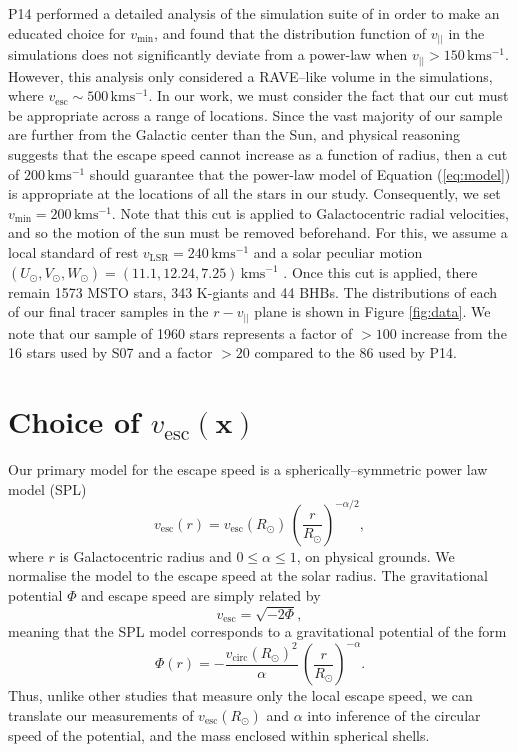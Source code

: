 \documentclass[useAMS,twocolumn,usenatbib]{mn2e}
\def\kms{{\,\mathrm{kms^{-1}}}}
\def\vlos{{v_{||}}}
\def\vesc{{v_\mathrm{esc}}}
\def\pos{{\boldsymbol{x}}}
\begin{document}
P14 performed a detailed analysis of the simulation suite of
\citet{Sc09} in order to make an educated choice for $v_\mathrm{min}$,
and found that the distribution function of $\vlos$ in the simulations
does not significantly deviate from a power-law when
$\vlos>150\kms$. However, this analysis only considered a RAVE--like
volume in the simulations, where $\vesc\sim500\kms$. In our work, we
must consider the fact that our cut must be appropriate across a range
of locations.  Since the vast majority of our sample are further from
the Galactic center than the Sun, and physical reasoning suggests that
the escape speed cannot increase as a function of radius, then a cut
of $200\kms$ should guarantee that the power-law model of Equation
(\ref{eq:model}) is appropriate at the locations of all the stars in
our study. Consequently, we set $v_\mathrm{min}=200\kms$.  Note that
this cut is applied to Galactocentric radial velocities, and so the
motion of the sun must be removed beforehand. For this, we assume a
local standard of rest $v_\mathrm{LSR} = 240\kms$ and a solar peculiar
motion $\left(U_\odot,V_\odot,W_\odot\right) =
\left(11.1,12.24,7.25\right)\kms$ \citep{Sc10}.  Once this cut is
applied, there remain 1573 MSTO stars, 343 K-giants and 44 BHBs. The
distributions of each of our final tracer samples in the $r-\vlos$
plane is shown in Figure \ref{fig:data}. We note that our sample of
1960 stars represents a factor of $>100$ increase from the 16 stars
used by S07 and a factor $>20$ compared to the 86 used by P14.

\section{Choice of $\vesc(\pos)$}

\label{sec:pot}

Our primary model for the escape speed is a spherically--symmetric
power law model (SPL)
%
\begin{equation}
\vesc(r) = \vesc(R_\odot)\,\left(\dfrac{r}{R_\odot}\right)^{-\alpha/2},
\end{equation}
%
where $r$ is Galactocentric radius and $0 \leq \alpha \leq 1$, on
physical grounds.  We normalise the model to the escape speed at the
solar radius. The gravitational potential $\Phi$ and escape speed are
simply related by
%
\begin{equation}
\vesc = \sqrt{-2\Phi},
\end{equation}
%
meaning that the SPL model corresponds to a gravitational potential of
the form
%
\begin{equation}
\Phi(r) = -\dfrac{v_\mathrm{circ}(R_\odot)^2}{\alpha}\,\left(\dfrac{r}{R_\odot}\right)^{-\alpha}.
\label{eq:splgrav}
\end{equation}
%
Thus, unlike other studies that measure only the local escape speed,
we can translate our measurements of $\vesc(R_\odot)$ and $\alpha$
into inference of the circular speed of the potential, and the mass
enclosed within spherical shells.
\end{document}
